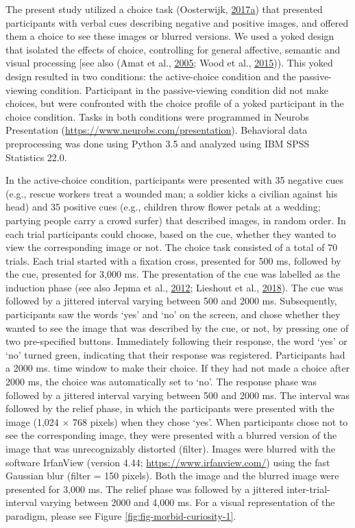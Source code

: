 \documentclass[11pt,american,a4paper,oneside,]{memoir} %
\begin{document}
The present study utilized a choice task (Oosterwijk, \protect\hyperlink{ref-oosterwijk2017choosing}{2017}\protect\hyperlink{ref-oosterwijk2017choosing}{a}) that presented participants with verbal cues describing negative and positive images, and offered them a choice to see these images or blurred versions. We used a yoked design that isolated the effects of choice, controlling for general affective, semantic and visual processing {[}see also (Amat et al., \protect\hyperlink{ref-amat2005medial}{2005}; Wood et al., \protect\hyperlink{ref-wood2015controllability}{2015})). This yoked design resulted in two conditions: the active-choice condition and the passive-viewing condition. Participant in the passive-viewing condition did not make choices, but were confronted with the choice profile of a yoked participant in the choice condition. Tasks in both conditions were programmed in Neurobs Presentation (\url{https://www.neurobs.com/presentation}). Behavioral data preprocessing was done using Python 3.5 and analyzed using IBM SPSS Statistics 22.0.

In the active-choice condition, participants were presented with 35 negative cues (e.g., rescue workers treat a wounded man; a soldier kicks a civilian against his head) and 35 positive cues (e.g., children throw flower petals at a wedding; partying people carry a crowd surfer) that described images, in random order. In each trial participants could choose, based on the cue, whether they wanted to view the corresponding image or not. The choice task consisted of a total of 70 trials. Each trial started with a fixation cross, presented for 500 ms, followed by the cue, presented for 3,000 ms. The presentation of the cue was labelled as the induction phase (see also Jepma et al., \protect\hyperlink{ref-jepma2012neural}{2012}; Lieshout et al., \protect\hyperlink{ref-van2018induction}{2018}). The cue was followed by a jittered interval varying between 500 and 2000 ms. Subsequently, participants saw the words `yes' and `no' on the screen, and chose whether they wanted to see the image that was described by the cue, or not, by pressing one of two pre-specified buttons. Immediately following their response, the word `yes' or `no' turned green, indicating that their response was registered. Participants had a 2000 ms. time window to make their choice. If they had not made a choice after 2000 ms, the choice was automatically set to `no'. The response phase was followed by a jittered interval varying between 500 and 2000 ms. The interval was followed by the relief phase, in which the participants were presented with the image (1,024 × 768 pixels) when they chose `yes'. When participants chose not to see the corresponding image, they were presented with a blurred version of the image that was unrecognizably distorted (filter). Images were blurred with the software IrfanView (version 4.44; \url{https://www.irfanview.com/}) using the fast Gaussian blur (filter = 150 pixels). Both the image and the blurred image were presented for 3,000 ms. The relief phase was followed by a jittered inter-trial-interval varying between 2000 and 4,000 ms. For a visual representation of the paradigm, please see Figure \ref{fig:fig-morbid-curiosity-1}.
\end{document}
